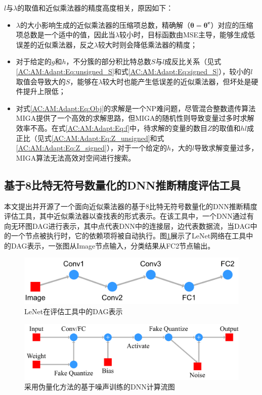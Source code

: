 $l$与$\lambda$的取值和近似乘法器的精度高度相关，原因如下：
\begin{itemize}
    \item $\lambda$的大小影响生成的近似乘法器的压缩项总数，精确解（$\boldsymbol{\theta} = \boldsymbol{{\theta}^{e}}$）对应的压缩项总数是一个适中的值，因此当$\lambda$较小时，目标函数由MSE主导，能够生成低误差的近似乘法器，反之$\lambda$较大时则会降低乘法器的精度；
    \item 对于给定的$g$和$h$，不分簇的部分积比特总数$S$与$l$成反比关系（见式\eqref{AC:AM:Adapt:Eq:unsigned_S}和式\eqref{AC:AM:Adapt:Eq:signed_S}），较小的$l$取值会导致大的$S$，能够在$\lambda$较大时也能产生低误差的近似乘法器，但坏处是硬件提升上限低；
    \item 对式\eqref{AC:AM:Adapt:Eq:Obj}的求解是一个NP难问题，尽管混合整数遗传算法MIGA提供了一个高效的求解思路，但MIGA的随机性则导致变量过多时求解效率不高。在式\eqref{AC:AM:Adapt:Eq:f}中，待求解的变量的数目$Z$的取值和$hl$成正比（见式\eqref{AC:AM:Adapt:Eq:Z_unsigned}和式\eqref{AC:AM:Adapt:Eq:Z_signed}），对于一个给定的$h$，大的$l$导致求解变量过多，MIGA算法无法高效对空间进行搜索。
\end{itemize}


\subsection{基于8比特无符号数量化的DNN推断精度评估工具}

本文提出并开源了一个面向近似乘法器的基于8比特无符号数量化的DNN推断精度评估工具，其中近似乘法器以查找表的形式表示。在该工具中，一个DNN通过有向无环图DAG进行表示，其中点代表DNN中的连接层，边代表数据流，当DAG中的一个节点被执行时，它的依赖项将被自动执行。图\ref{DNN:ApproxFlow:Fig:LeNet}展示了LeNet网络\cite{DNN:LeNet_MNIST}在工具中的DAG表示，一张图从Image节点输入，分类结果从FC2节点输出。

\begin{figure}[!ht]
    \centering
    \includegraphics[width=0.7\linewidth]{./figs/DNN-ApproxFlow_LeNet.pdf}
    \caption{LeNet在评估工具中的DAG表示}
    \label{DNN:ApproxFlow:Fig:LeNet}
\end{figure}

\begin{figure}[!ht]
    \centering
    \includegraphics[width=0.85\linewidth]{./figs/DNN-ApproxFlow_fake_quantize.pdf}
    \caption{采用伪量化方法的基于噪声训练的DNN计算流图}
    \label{DNN:ApproxFlow:Fig:fake_quantize_noise}
\end{figure}

